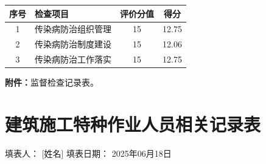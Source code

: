 \documentclass[UTF8,10pt,a4paper,fontset=fandol]{ctexart}
\newcommand{\fieldvalue}[1]{#1}
\newcommand{\handwritten}[1]{#1}
\begin{document}
\vspace{0.5em}

\noindent
\begin{tabularx}{\textwidth}{|c|X|c|c|}
\hline
\textbf{序号} & \textbf{检查项目} & \textbf{评价分值} & \textbf{得分}\\
\hline
1 & 传染病防治组织管理 & 15 & 
\fieldvalue{\handwritten{12.75}}\\
\hline
2 & 传染病防治制度建设 & 15 & 
\fieldvalue{\handwritten{12.06}}\\
\hline
3 & 传染病防治工作落实 & 15 & 
\fieldvalue{\handwritten{12.75}}\\
\hline
\end{tabularx}

\noindent
\textbf{附件：}监督检查记录表。


\newpage

\section*{建筑施工特种作业人员相关记录表}


\noindent
填表人：
\fieldvalue{\handwritten{[姓名]}}
\hfill
填表日期：
\fieldvalue{\handwritten{2025年06月18日}}

\vspace{1em}
\end{document}
